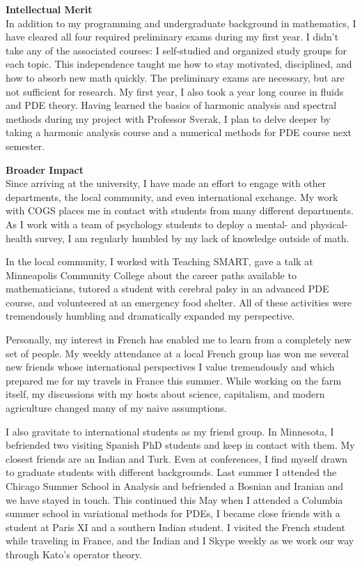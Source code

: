\documentclass[12pt]{article}
\begin{document}

\textbf{Intellectual Merit}\\
In addition to my programming and undergraduate background in mathematics, I  have cleared all four required preliminary exams during  my first year. I didn't take any of the associated courses: I self-studied and organized study groups for each topic. This independence taught me how to stay motivated, disciplined, and how to absorb new math quickly. The preliminary exams are necessary, but are not sufficient for research. My first year, I also took a year long course in fluids and PDE theory. Having learned the basics of harmonic analysis and spectral methods during  my project with Professor Sverak, I plan to delve deeper by taking a harmonic analysis course and a numerical methods for PDE course next semester.

\textbf{Broader Impact}\\
Since arriving at the university, I have made an effort to engage with other departments, the local community, and even international exchange. My work with COGS places me in contact with students from many different departments. As I work with a team of psychology students to deploy a mental- and physical-health survey, I am regularly humbled by my lack of knowledge outside of math.

In the local community, I worked with Teaching SMART, gave a talk at Minneapolis Community College about the career paths available to mathematicians,  tutored a student with cerebral palsy in an advanced PDE course, and volunteered at an emergency food shelter. All of these activities were tremendously humbling and dramatically expanded my perspective.

Personally, my interest in French has enabled me to learn from a completely new set of people. My weekly attendance at a local French group has won me several new friends whose international perspectives I value tremendously and which prepared me for my travels in France this summer. While working on the farm itself, my discussions with my hosts about science, capitalism, and modern agriculture changed many of my naive assumptions. 

I also gravitate to international students as my friend group. In Minnesota, I befriended two visiting Spanish PhD students and keep in contact with them. My closest friends are an Indian and Turk. Even at conferences, I find myself drawn to graduate students with different backgrounds. Last summer I attended the Chicago Summer School in Analysis and befriended a Bosnian and Iranian and we have stayed in touch. This continued this May when I attended a Columbia summer school in variational methods for PDEs, I became close friends with a student at Paris XI and a southern Indian student. I visited the French student while traveling in France, and the Indian and I Skype weekly as we work our way through Kato's operator theory.
\end{document}
